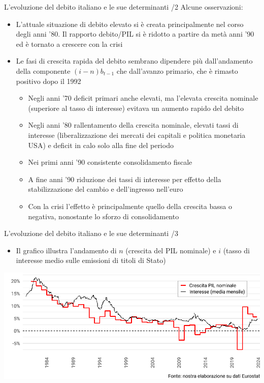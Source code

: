 \documentclass[aspectratio=149,11pt,italian]{beamer}
\begin{document}
\begin{frame}{L'evoluzione del debito italiano e le sue determinanti /2}
Alcune osservazioni:
\begin{itemize}
\item L'attuale situazione di debito elevato si è creata principalmente nel corso
degli anni '80. Il rapporto debito/PIL si è ridotto a partire da metà anni
'90 ed è tornato a crescere con la crisi
\item Le fasi di crescita rapida del debito sembrano dipendere più dall'andamento
della componente $(i-n)b_{t-1}$ che dall'avanzo primario, che è rimasto positivo
dopo il 1992
\begin{itemize}
\item Negli anni '70 deficit primari anche elevati, ma l'elevata crescita
nominale (superiore al tasso di interesse) evitava un aumento rapido del
debito
\item Negli anni '80 rallentamento della crescita nominale, elevati tassi di
interesse (liberalizzazione dei mercati dei capitali e politica monetaria
USA) e deficit in calo solo alla fine del periodo
\item Nei primi anni '90 consistente consolidamento fiscale
\item A fine anni '90 riduzione dei tassi di interesse per effetto della
stabilizzazione del cambio e dell'ingresso nell'euro
\item Con la crisi l'effetto è principalmente quello della crescita bassa o
negativa, nonostante lo sforzo di consolidamento
\end{itemize}
\end{itemize}
\end{frame}

\begin{frame}{L'evoluzione del debito italiano e le sue determinanti /3}
\begin{itemize}
\item Il grafico illustra l'andamento di $n$ (crescita del PIL nominale) e $i$ (tasso di interesse medio sulle emissioni di titoli di Stato)
\end{itemize}

\begin{center}
\centering
\includegraphics[width=\textwidth]{./figure/interesse-crescita-Italy-color.pdf}
\end{center}
\end{frame}
\end{document}
